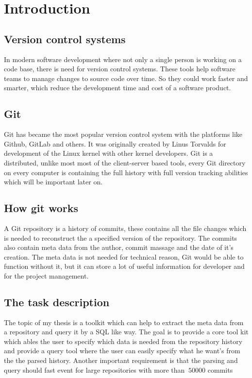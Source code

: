 \chapter{Introduction}
\label{ch:intro}

\section{Version control systems}
In modern software development where not only a single person is working on a code base, there is need for version control systems. These tools help software teams to manage changes to source code over time. So they could work faster and smarter, which reduce the development time and cost of a software product.

\section{Git}
Git has became the most popular version control system with the platforms like Github\cite{dijkstra1979goto}, GitLab\cite{Gitlab} and others. It was originally created by Linus Torvalds \cite{linus} for development of the Linux kernel with other kernel developers. Git is a distributed, unlike most most of the client-server based tools, every Git directory on every computer is containing the full history with full version tracking abilities which will be important later on.

\section{How git works}
A Git repository is a history of commits, these contains all the file changes which is needed to reconstruct the a specified version of the repository. The commits also contain meta data from the author, commit massage and the date of it's creation.
The meta data is not needed for technical reason, Git would be able to function without it, but it can store a lot of useful information for developer and for the project management.

\section{The task description}
The topic of my thesis is a toolkit which can help to extract the meta data from a repository and query it by a SQL like way. The goal is to provide a core tool kit which ables the user to specify which data is needed from the repository history and provide a query tool where the user can easily specify what he want's from the the parsed history. Another important requirement is that the parsing and query should fast event for large repositories with more than \(~50000\) commits  

